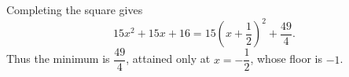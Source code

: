 Completing the square gives
\[
15x^2+15x+16=15\left(x+\dfrac{1}{2}\right)^2+\dfrac{49}{4}.
\]
Thus the minimum is $\boxed{\dfrac{49}{4}}$, attained only at $x=-\dfrac{1}{2}$, whose floor is $\boxed{-1}$.
